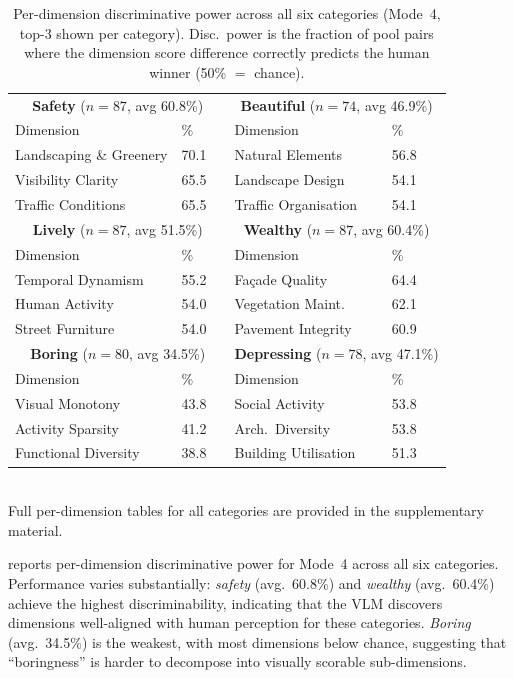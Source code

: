 \documentclass[runningheads]{llncs}
\begin{document}
\begin{table}[t]
\centering
\caption{Per-dimension discriminative power across all six categories (Mode~4, top-3 shown per category). Disc.\ power is the fraction of pool pairs where the dimension score difference correctly predicts the human winner (50\% $=$ chance).}
\label{tab:dim_disc}
\small
\begin{tabular}{llc|llc}
\toprule
\multicolumn{3}{c|}{\textbf{Safety} ($n{=}87$, avg 60.8\%)} & \multicolumn{3}{c}{\textbf{Beautiful} ($n{=}74$, avg 46.9\%)} \\
Dimension & \% && Dimension & \% & \\
\midrule
Landscaping \& Greenery & 70.1 && Natural Elements & 56.8 & \\
Visibility Clarity & 65.5 && Landscape Design & 54.1 & \\
Traffic Conditions & 65.5 && Traffic Organisation & 54.1 & \\
\midrule
\multicolumn{3}{c|}{\textbf{Lively} ($n{=}87$, avg 51.5\%)} & \multicolumn{3}{c}{\textbf{Wealthy} ($n{=}87$, avg 60.4\%)} \\
Dimension & \% && Dimension & \% & \\
\midrule
Temporal Dynamism & 55.2 && Fa\c{c}ade Quality & 64.4 & \\
Human Activity & 54.0 && Vegetation Maint. & 62.1 & \\
Street Furniture & 54.0 && Pavement Integrity & 60.9 & \\
\midrule
\multicolumn{3}{c|}{\textbf{Boring} ($n{=}80$, avg 34.5\%)} & \multicolumn{3}{c}{\textbf{Depressing} ($n{=}78$, avg 47.1\%)} \\
Dimension & \% && Dimension & \% & \\
\midrule
Visual Monotony & 43.8 && Social Activity & 53.8 & \\
Activity Sparsity & 41.2 && Arch.\ Diversity & 53.8 & \\
Functional Diversity & 38.8 && Building Utilisation & 51.3 & \\
\bottomrule
\end{tabular}
\\[4pt]
\footnotesize{Full per-dimension tables for all categories are provided in the supplementary material.}
\end{table}

 reports per-dimension discriminative power for Mode~4 across all six categories.
Performance varies substantially: \emph{safety} (avg.\ 60.8\%) and \emph{wealthy} (avg.\ 60.4\%) achieve the highest discriminability, indicating that the VLM discovers dimensions well-aligned with human perception for these categories.
\emph{Boring} (avg.\ 34.5\%) is the weakest, with most dimensions below chance, suggesting that ``boringness'' is harder to decompose into visually scorable sub-dimensions.
\end{document}
